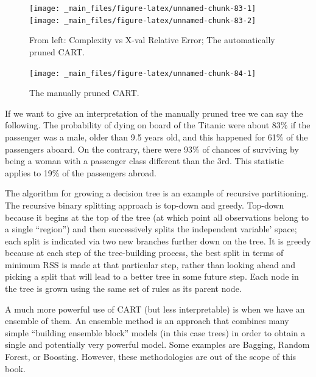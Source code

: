 \documentclass[
]{svmono}
\begin{document}
\begin{figure}[H]
\texttt{[image: \_main\_files/figure-latex/unnamed-chunk-83-1]} \texttt{[image: \_main\_files/figure-latex/unnamed-chunk-83-2]} \caption{From left: Complexity vs X-val Relative Error; The automatically pruned CART.}\label{fig:unnamed-chunk-83}
\end{figure}

\begin{figure}[H]

{\centering \texttt{[image: \_main\_files/figure-latex/unnamed-chunk-84-1]} 

}

\caption{The manually pruned CART.}\label{fig:unnamed-chunk-84}
\end{figure}

If we want to give an interpretation of the manually pruned tree we can
say the following. The probability of dying on board of the Titanic were
about 83\% if the passenger was a male, older than 9.5 years old, and
this happened for 61\% of the passengers aboard. On the contrary, there
were 93\% of chances of surviving by being a woman with a passenger class
different than the 3rd. This statistic applies to 19\% of the passengers
abroad.

The algorithm for growing a decision tree is an example of recursive
partitioning. The recursive binary splitting approach is top-down and
greedy. Top-down because it begins at the top of the tree (at which
point all observations belong to a single ``region'') and then
successively splits the independent variable' space; each split is
indicated via two new branches further down on the tree. It is greedy
because at each step of the tree-building process, the best split in
terms of minimum RSS is made at that particular step, rather than
looking ahead and picking a split that will lead to a better tree in
some future step. Each node in the tree is grown using the same set of
rules as its parent node.

A much more powerful use of CART (but less interpretable) is when we
have an ensemble of them. An ensemble method is an approach that
combines many simple ``building ensemble block'' models (in this case
trees) in order to obtain a single and potentially very powerful model.
Some examples are Bagging, Random Forest, or Boosting. However, these
methodologies are out of the scope of this book.

~

~

~
\end{document}
